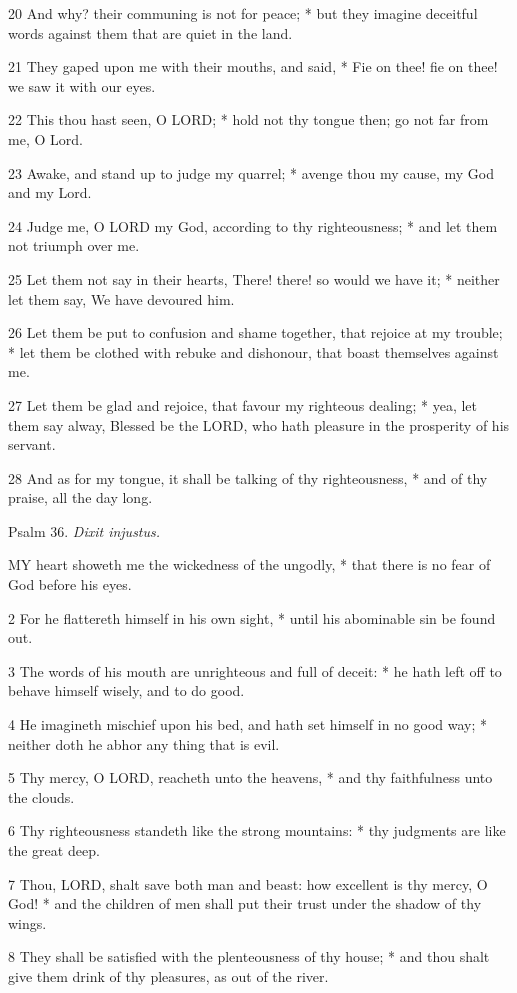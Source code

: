 20 And why? their communing is not for peace; * but
they imagine deceitful words against them that are quiet in the land.

21 They gaped upon me with their mouths, and said,
* Fie on thee! fie on thee! we saw it with our eyes.

22 This thou hast seen, O LORD;
* hold not thy tongue then; go not far from me, O Lord.

23 Awake, and stand up to judge my quarrel; * avenge
thou my cause, my God and my Lord.

24 Judge me, O LORD my God,
according to thy righteousness; * and let them not triumph over me.

25 Let them not say in their hearts, There! there!
so would we have it; * neither let them say, We have devoured him.

26 Let them be put to confusion and shame together,
that rejoice at my trouble; * let them be clothed with rebuke and dishonour,
that boast themselves against me.

27 Let them be glad and rejoice, that favour my righteous
dealing; * yea, let them say alway, Blessed be the LORD,
who hath pleasure in the prosperity of his servant.

28 And as for my tongue, it shall be talking of thy
righteousness, * and of thy praise, all the day long.

Psalm
36. \emph{Dixit injustus.}

MY
heart showeth me the wickedness of the ungodly, * that there is no fear
of God before his eyes.

2 For he flattereth himself in his own sight, * until
his abominable sin be found out.

3 The words of his mouth are unrighteous and full of
deceit: * he hath left off to behave himself wisely, and to do good.

4 He imagineth mischief upon his bed, and hath set
himself in no good way; * neither doth he abhor any thing that is evil.

5 Thy mercy, O LORD, reacheth
unto the heavens, * and thy faithfulness unto the clouds.

6 Thy righteousness standeth like the strong mountains:
* thy judgments are like the great deep.

7 Thou, LORD, shalt save both
man and beast: how excellent is thy mercy, O God! * and the children of
men shall put their trust under the shadow of thy wings.

8 They shall be satisfied with the plenteousness of
thy house; * and thou shalt give them drink of thy pleasures, as out of
the river.

